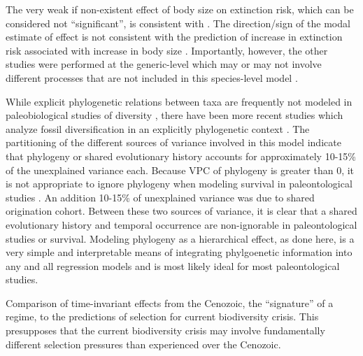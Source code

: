 \documentclass[12pt,letterpaper]{article}
\begin{document}
The very weak if non-existent effect of body size on extinction risk, which can be considered not ``significant'', is consistent with \citet{Tomiya2013}. The direction/sign of the modal estimate of effect is not consistent with the prediction of increase in extinction risk associated with increase in body size \citep{Liow2008}. Importantly, however, the other studies were performed at the generic-level which may or may not involve different processes that are not included in this species-level model \citep{Liow2008,Tomiya2013}.

While explicit phylogenetic relations between taxa are frequently not modeled in paleobiological studies of diversity \citep{Alroy2009,Foote2013,Jablonski2006a,Hunt2007a,Liow2008,Payne2007,Alroy2000g,Jernvall2002,Jernvall2004,Marcot2014}, there have been more recent studies which analyze fossil diversification in an explicitly phylogenetic context \citep{Slater2012,Slater2013a,Tomiya2013,Harnik2014,Simpson2011a}. The partitioning of the different sources of variance involved in this model indicate that phylogeny or shared evolutionary history accounts for approximately 10-15\% of the unexplained variance each. Because VPC of phylogeny is greater than 0, it is not appropriate to ignore phylogeny when modeling survival in paleontological studies \citep{Housworth2004}. An addition 10-15\% of unexplained variance was due to shared origination cohort. Between these two sources of variance, it is clear that a shared evolutionary history and temporal occurrence are non-ignorable in paleontological studies or survival. Modeling phylogeny as a hierarchical effect, as done here, is a very simple and interpretable means of integrating phylgoenetic information into any and all regression models \citep{Lynch1991,Housworth2004} and is most likely ideal for most paleontological studies.






Comparison of time-invariant effects from the Cenozoic, the ``signature'' of a regime, to the predictions of selection for current biodiversity crisis. This presupposes that the current biodiversity crisis may involve fundamentally different selection pressures than experienced over the Cenozoic.

\end{document}
